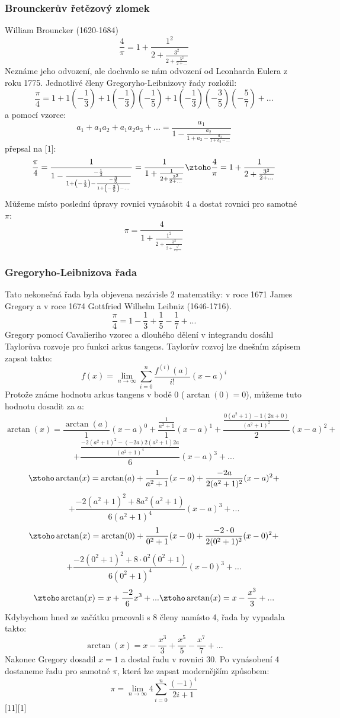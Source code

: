 \documentclass[rocnikovka]{gzwroc} %
\begin{document}
\subsubsection{Brounckerův řetězový zlomek}
William Brouncker (1620-1684)
\begin{equation}
\frac{4}{\pi}=1+\frac{1^2}{2+\frac{3^2}{2+\frac{5^2}{2+...}}}
\end{equation}
Neznáme jeho odvození, ale dochvalo se nám odvození od Leonharda Eulera z roku 1775. Jednotlivé členy Gregoryho-Leibnizovy řady rozložil:
$$
\frac{\pi}{4}=1+1\left(-\frac{1}{3}\right)+1\left(-\frac{1}{3}\right)\left(-\frac{1}{5}\right)+1\left(-\frac{1}{3}\right)\left(-\frac{3}{5}\right)\left(-\frac{5}{7}\right)+...
$$
a pomocí vzorce:
$$
a_1+a_1a_2+a_1a_2a_3+...=\frac{a_1}{1-\frac{a_2}{1+a_2-\frac{a_3}{1+a_3-...}}}
$$
přepsal na [1]:
$$
\frac{\pi}{4}=\frac{1}{1-\frac{-\frac{1}{3}}{1+\left(-\frac{1}{3}\right)-\frac{-\frac{3}{5}}{1+\left(-\frac{3}{5}\right)-...}}}=\frac{1}{1+\frac{1}{2+\frac{3^2}{2+...}}} \ztoho \frac{4}{\pi}=1+\frac{1}{2+\frac{3^2}{2+...}}
$$
Můžeme místo poslední úpravy rovnici vynásobit 4 a dostat rovnici pro samotné $\pi$:
\begin{equation}
\pi=\frac{4}{1+\frac{1^2}{2+\frac{3^2}{2+\frac{5^2}{2+...}}}}
\end{equation}
\subsubsection{Gregoryho-Leibnizova řada}
Tato nekonečná řada byla objevena nezávisle 2 matematiky: v roce 1671 James Gregory a v roce 1674 Gottfried Wilhelm Leibniz (1646-1716).
\begin{equation}
\frac{\pi}{4}=1-\frac{1}{3}+\frac{1}{5}-\frac{1}{7}+...
\end{equation}
Gregory pomocí Cavalieriho vzorec a dlouhého dělení v integrandu dosáhl Taylorůva rozvoje pro funkci arkus tangens. Taylorův rozvoj lze dnešním zápisem zapsat takto:
$$
f(x)=\lim_{n\to\infty} \sum_{i=0}^{n} \frac{f^{(i)}(a)}{i!}(x-a)^i
$$
Protože známe hodnotu arkus tangens v bodě 0 ($\arctan(0)=0$), můžeme tuto hodnotu dosadit za $a$:
$$
\arctan(x)=\frac{\arctan(a)}{1}(x-a)^0+\frac{\frac{1}{a^2+1}}{1}(x-a)^1+\frac{\frac{0(a^2+1)-1(2a+0)}{(a^2+1)^2}}{2}(x-a)^2+
$$
$$
+\frac{\frac{-2(a^2+1)^2-(-2a)2(a^2+1)2a}{(a^2+1)^4}}{6}(x-a)^3+...
$$
$$
\ztoho \arctan(x)=\arctan(a)+\frac{1}{a^2+1}(x-a)+\frac{-2a}{2(a^2+1)^2}(x-a)^2+
$$
$$
+\frac{-2(a^2+1)^2+8a^2(a^2+1)}{6(a^2+1)^4}(x-a)^3+...
$$
$$
\ztoho \arctan(x)=\arctan(0)+\frac{1}{0^2+1}(x-0)+\frac{-2\cdot0}{2(0^2+1)^2}(x-0)^2+
$$
$$
+\frac{-2(0^2+1)^2+8\cdot0^2(0^2+1)}{6(0^2+1)^4}(x-0)^3+...
$$
$$
\ztoho \arctan(x)=x+\frac{-2}{6}x^3+...\ztoho \arctan(x)=x-\frac{x^3}{3}+...
$$
Kdybychom hned ze začátku pracovali s 8 členy namísto 4, řada by vypadala takto:
$$
\arctan(x)=x-\frac{x^3}{3}+\frac{x^5}{5}-\frac{x^7}{7}+...
$$
Nakonec Gregory dosadil $x=1$ a dostal řadu v rovnici 30. Po vynásobení 4 dostaneme řadu pro samotné $\pi$, která lze zapsat modernějším způsobem:
\begin{equation}
\pi=\lim_{n\to\infty} 4\sum_{i=0}^{n} \frac{(-1)^i}{2i+1}
\end{equation}
[11][1]
\end{document}
